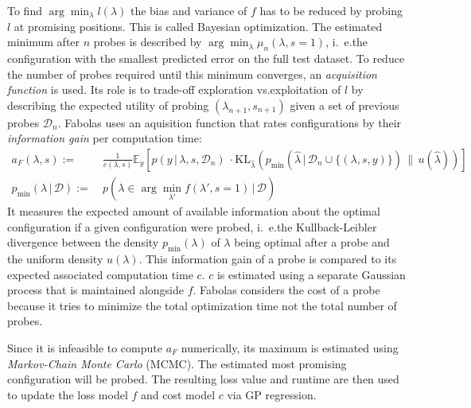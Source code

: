 To find \(\arg\min_\lambda l(\lambda)\) the bias and variance of \(f\) has to be reduced by probing \(l\) at promising positions.
This is called Bayesian optimization.
The estimated minimum after \(n\) probes is described by \(\arg\min_\lambda \mu_n(\lambda, s = 1)\), i.~e.\@ the configuration with the smallest predicted error on the full test dataset.
To reduce the number of probes required until this minimum converges, an \textit{acquisition function} is used.
Its role is to trade-off exploration vs.\@ exploitation of \(l\) by describing the expected utility of probing \((\lambda_{n+1}, s_{n+1})\) given a set of previous probes \(\mathcal{D}_n\).
Fabolas uses an aquisition function that rates configurations by their \textit{information gain} per computation time:
\begin{align}
	a_F(\lambda, s) :=&\ \frac{1}{c(\lambda, s)} \mathbb{E}_y\left[ p(y\, |\, \lambda, s, \mathcal{D}_n)\ \cdot \mathrm{KL}_{\hat{\lambda}}(p_{\min}(\hat{\lambda}\, |\, \mathcal{D}_n \cup \{(\lambda, s, y)\})\, \|\, u(\hat{\lambda}))\right] \\
	p_{\min}(\lambda\, |\, \mathcal{D}) :=&\ p(\lambda \in \arg\min_{\lambda'}{f(\lambda', s = 1)}\, |\, \mathcal{D}) \nonumber
\end{align}
It measures the expected amount of available information about the optimal configuration if a given configuration were probed, i.~e.\@ the Kullback-Leibler divergence between the density \(p_{\min}(\lambda)\) of \(\lambda\) being optimal after a probe and the uniform density \(u(\lambda)\).
This information gain of a probe is compared to its expected associated computation time \(c\).
\(c\) is estimated using a separate Gaussian process that is maintained alongside \(f\).
Fabolas considers the cost of a probe because it tries to minimize the total optimization time not the total number of probes.

Since it is infeasible to compute \(a_F\) numerically, its maximum is estimated using \textit{Markov-Chain Monte Carlo} (MCMC).
The estimated most promising configuration will be probed.
The resulting loss value and runtime are then used to update the loss model \(f\) and cost model \(c\) via GP regression.

